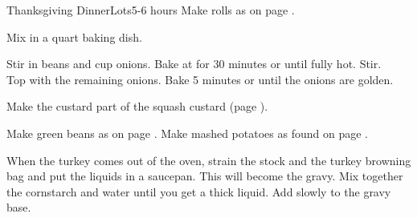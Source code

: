 \documentclass[../Cookbook.tex]{subfiles}
\begin{document}
\begin{recipe}{Thanksgiving Dinner}{Lots}{5-6 hours}
\newstep
Make rolls as on page \pageref{DinnerRolls}.

Mix in a  quart baking dish.

Stir in beans and  cup onions. Bake at  for 30 minutes or until fully hot. Stir.\\
Top with the remaining onions. Bake 5 minutes or until the onions are golden.

\newstep
Make the custard part of the squash custard (page \pageref{SquashCustard}).

\newstep
Make green beans as on page \pageref{CreamBeans}.
Make mashed potatoes as found on page \pageref{MashedPotatoes}.

When the turkey comes out of the oven, strain the stock and the turkey browning bag and put the liquids in a saucepan. This will become the gravy. Mix together the cornstarch and water until you get a thick liquid. Add slowly to the gravy base.

\end{recipe}
\end{document}
